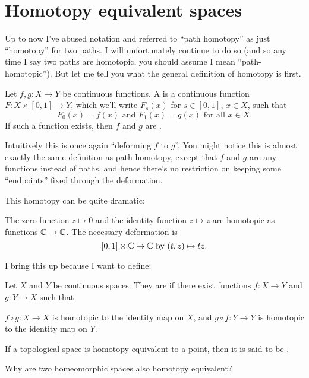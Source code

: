 \section{Homotopy equivalent spaces}
Up to now I've abused notation and referred to ``path homotopy'' as just ``homotopy'' for two paths.
I will unfortunately continue to do so (and so any time I say two paths are homotopic, you should assume I mean ``path-homotopic'').
But let me tell you what the general definition of homotopy is first.
\begin{definition}
	Let $f,g \colon X \to Y$ be continuous functions.
	A  is a continuous function $F \colon X \times [0,1] \to Y$,
	which we'll write $F_s(x)$ for $s \in [0,1]$, $x \in X$, such that
	\[ F_0(x) = f(x) \text{ and } F_1(x) = g(x) \text{ for all $x \in X$.} \]
	If such a function exists, then $f$ and $g$ are .
\end{definition}
Intuitively this is once again ``deforming $f$ to $g$''.
You might notice this is almost exactly the same definition as path-homotopy,
except that $f$ and $g$ are any functions instead of paths, and hence
there's no restriction on keeping some ``endpoints'' fixed through the deformation.

This homotopy can be quite dramatic:
\begin{example}
	The zero function $z \mapsto 0$ and the identity function $z \mapsto z$
	are homotopic as functions $\mathbb C \to \mathbb C$.
	The necessary deformation is
	\[ [0,1] \times \mathbb C \to \mathbb C \text{ by } (t,z) \mapsto tz. \]
\end{example}

I bring this up because I want to define:
\begin{definition}
	Let $X$ and $Y$ be continuous spaces.
	They are  if there exist
	functions $f \colon X \to Y$ and $g \colon Y \to X$ such that
	\begin{enumerate}[(i)]
		\ii $f \circ g \colon X \to X$ is homotopic to the identity map on $X$, and
		\ii $g \circ f \colon Y \to Y$ is homotopic to the identity map on $Y$.
	\end{enumerate}
	If a topological space is homotopy equivalent to a point,
	then it is said to be .
\end{definition}
\begin{ques}
	Why are two homeomorphic spaces also homotopy equivalent?
\end{ques}


